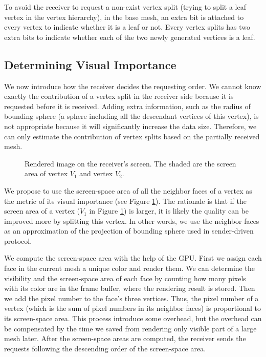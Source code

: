      To avoid the receiver to request a non-exist vertex split (trying to split
     a leaf vertex in the vertex hierarchy),
     in the base mesh, an extra bit is attached to every vertex to indicate whether it is a leaf or not.
     Every vertex splits has two extra bits to indicate whether each of the two newly generated vertices 
     is a leaf.
     \subsection{Determining Visual Importance}
     \label{ss:dstream:visual}
     We now introduce how the receiver decides the requesting order. 
     We cannot know exactly the contribution of a vertex split in the receiver side
     because it is requested before it is received.
     Adding extra information, such as the radius of bounding sphere (a sphere including all the 
     descendant vertices of this vertex), is not appropriate
     because it will significantly increase the data size. 
     Therefore, we can only estimate the contribution of vertex splits based on the 
     partially received mesh.
     
    \begin{figure}
    \centering
    \caption[Screen area]{Rendered image on the receiver's screen. 
    The shaded are the screen area of vertex $V_1$ and vertex $V_2$.
    \label{dstream:screen_area}}
    \end{figure}
     We propose to use the screen-space area of all the neighbor faces of a vertex as the 
     metric of its visual importance (see Figure \ref{dstream:screen_area}).
     The rationale is that if the screen area of a vertex ($V_1$ in Figure \ref{dstream:screen_area}) 
    is larger, it is likely the quality can be improved more by splitting this vertex. 
    In other words, we use the neighbor faces as an approximation of the projection of bounding sphere used
    in sender-driven protocol.
    
    We compute the screen-space area with the help of the GPU. 
    First we assign each face in the current mesh a unique color and render them. 
    We can determine the visibility
    and the screen-space area of each face by counting how many pixels with its color
    are in the frame buffer, where the rendering result is stored. 
    Then we add the pixel number to the face's three vertices. Thus, the
    pixel number of a vertex (which is the sum of pixel numbers in its neighbor faces)
    is proportional to its screen-space area.
    This process introduce some overhead, but the overhead can be compensated by the time
    we saved from rendering only visible part of a large mesh later. 
    After the screen-space areas are computed, 
    the receiver sends the requests following the descending order of the 
    screen-space area. 
    
